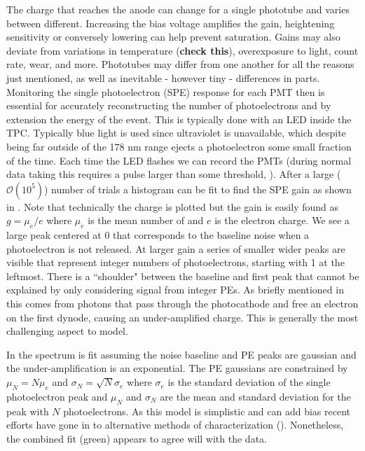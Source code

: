 The charge that reaches the anode can change for a single phototube and varies between different.  Increasing the bias voltage amplifies
the gain, heightening sensitivity or conversely lowering can help prevent saturation.  Gains may also deviate from variations in
temperature (\textbf{check this}), overexposure to light, count rate, wear, and more.  Phototubes may differ from one another
for all the reasons just mentioned, as well as inevitable - however tiny - differences in parts.  Monitoring the single photoelectron (SPE)
response for each PMT then is essential for accurately reconstructing the number of photoelectrons and by extension the energy of the
event.  This is typically done with an LED inside the TPC.  Typically blue light is used since ultraviolet is unavailable, which despite
being far outside of the 178 nm range ejects a photoelectron some small fraction of the time.  Each time the LED flashes we can record the
PMTs (during normal data taking this requires a pulse larger than some threshold, \secref{}).  After a large ($\mathcal{O}(10^{5})$)
number of trials a histogram can be fit to find the SPE gain as shown in .  Note that technically the charge
is plotted but the gain is easily found as $g = \mu_{e} / e$ where $\mu_{e}$ is the mean number of \electron and $e$ is the electron charge.  We
see a large peak centered at 0 that corresponds to the baseline noise when a photoelectron is not released.  At larger gain a series of
smaller wider peaks are visible that represent integer numbers of photoelectrons, starting with 1 at the leftmost.  There is a ``shoulder"
between the baseline and first peak that cannot be explained by only considering signal from integer PEs.  As briefly mentioned in
 this comes from photons that pass through the photocathode and free an electron on the first dynode, causing an
under-amplified charge.  This is generally the most challenging aspect to model.

In  the spectrum is fit assuming the noise baseline and PE peaks are gaussian and the under-amplification is
an exponential.  The PE gaussians are constrained by $\mu_{N} = N \mu_{e}$ and $\sigma_{N} = \sqrt{N} \sigma_{e}$ where $\sigma_{e}$ is the
standard deviation of the single photoelectron peak and $\mu_{N}$ and $\sigma_{N}$ are the mean and standard deviation for the peak with
$N$ photoelectrons.  As this model is simplistic and can add bias recent efforts have gone in to alternative methods
of characterization ().  Nonetheless, the combined fit (green) appears to agree will with the data.

